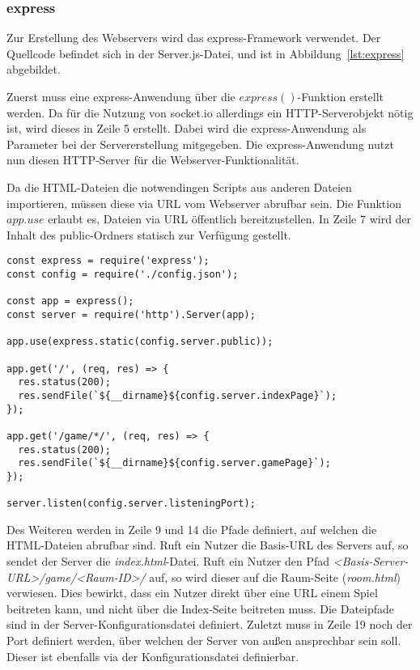\subsubsection{express}
Zur Erstellung des Webservers wird das \glqq{}express\grqq{}-Framework verwendet. Der Quellcode befindet sich in der \glqq{}Server.js\grqq{}-Datei, und ist in Abbildung~\ref{lst:express} abgebildet.\par

Zuerst muss eine express-Anwendung über die $express()$-Funktion erstellt werden. Da für die Nutzung von socket.io allerdings ein \acs{HTTP}-Serverobjekt nötig ist, wird dieses in Zeile 5 erstellt. Dabei wird die express-Anwendung als Parameter bei der Servererstellung mitgegeben. Die express-Anwendung nutzt nun diesen \acs{HTTP}-Server für die Webserver-Funktionalität.\par

Da die HTML-Dateien die notwendingen Scripts aus anderen Dateien importieren, müssen diese via \acs{URL} vom Webserver abrufbar sein. Die Funktion $app.use$ erlaubt es, Dateien via \acs{URL} öffentlich bereitzustellen. In Zeile 7 wird der Inhalt des \glqq{}public\grqq{}-Ordners statisch zur Verfügung gestellt.\par

\lstset{language=js, style=STYLE_CODE_JS}
\begin{minipage}{\textwidth}
\begin{singlespace}
\begin{lstlisting}[caption={express Server -- Server.js}, captionpos=b, label={lst:express}]
const express = require('express');
const config = require('./config.json');

const app = express();
const server = require('http').Server(app);

app.use(express.static(config.server.public));

app.get('/', (req, res) => {
  res.status(200);
  res.sendFile(`${__dirname}${config.server.indexPage}`);
});

app.get('/game/*/', (req, res) => {
  res.status(200);
  res.sendFile(`${__dirname}${config.server.gamePage}`);
});

server.listen(config.server.listeningPort);
\end{lstlisting}
\end{singlespace}
\end{minipage}

Des Weiteren werden in Zeile 9 und 14 die Pfade definiert, auf welchen die HTML-Dateien abrufbar sind. Ruft ein Nutzer die Basis-\acs{URL} des Servers auf, so sendet der Server die \textit{index.html}-Datei. Ruft ein Nutzer den Pfad \textit{<Basis-Server-URL>/game/<Raum-ID>/} auf, so wird dieser auf die Raum-Seite (\textit{room.html}) verwiesen. Dies bewirkt, dass ein Nutzer direkt über eine \acs{URL} einem Spiel beitreten kann, und nicht über die Index-Seite beitreten muss. Die Dateipfade sind in der Server-Konfigurationsdatei definiert. Zuletzt muss in Zeile 19 noch der Port definiert werden, über welchen der Server von außen ansprechbar sein soll. Dieser ist ebenfalls via der Konfigurationsdatei definierbar.

